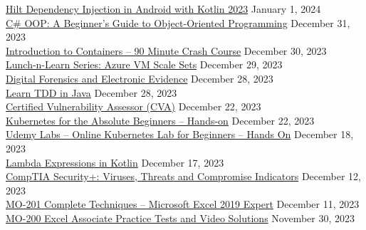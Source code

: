 \documentclass[10pt]{res} %
\begin{document}
\begin{resume}
\href{https://www.udemy.com/certificate/UC-a7321242-6a28-47bd-8f82-03e4c99372de}{\color{blue}Hilt Dependency Injection in Android with Kotlin 2023} \hfill January 1, 2024 \\
\href{https://www.udemy.com/certificate/UC-38f5c02a-aaf1-4d5f-ab4e-e7dd4f1c49cb}{\color{blue}C\# OOP: A Beginner's Guide to Object-Oriented Programming} \hfill December 31, 2023 \\
\href{https://www.udemy.com/certificate/UC-414ae691-4a04-410b-8b20-e8ac95063e46}{\color{blue}Introduction to Containers -- 90 Minute Crash Course} \hfill December 30, 2023 \\
\href{https://www.udemy.com/certificate/UC-3d0fcdfc-b284-4f51-b8d9-627cec5977d4}{\color{blue}Lunch-n-Learn Series: Azure VM Scale Sets} \hfill December 29, 2023 \\
\href{https://www.udemy.com/certificate/UC-6575dc02-3ebb-4eca-a40f-ed5b2932765b}{\color{blue}Digital Forensics and Electronic Evidence} \hfill December 28, 2023 \\
\href{https://www.udemy.com/certificate/UC-d3fab162-e168-4cd5-89b3-b12adcc61fa0}{\color{blue}Learn TDD in Java} \hfill December 28, 2023 \\
\href{https://www.udemy.com/certificate/UC-e34b247a-af92-4086-945a-d4144d8460d6}{\color{blue}Certified Vulnerability Assessor (CVA)} \hfill December 22, 2023 \\
\href{https://www.udemy.com/certificate/UC-9ccaf0ff-ce7d-45bd-9112-bbb4fa0709f4}{\color{blue}Kubernetes for the Absolute Beginners -- Hands-on} \hfill December 22, 2023 \\
\hspace*{1em}\faLaptop\space \href{https://kodekloud.com/certificate-verification/2D16C11DCB74-2DEA6B9505D1-2D16BAEADDF4}{\color{blue}Udemy Labs -- Online Kubernetes Lab for Beginners -- Hands On} \hfill December 18, 2023 \\
\href{https://www.udemy.com/certificate/UC-5a603cda-2254-4f28-a4a1-0a06aca10da6}{\color{blue}Lambda Expressions in Kotlin} \hfill December 17, 2023 \\
\href{https://www.udemy.com/certificate/UC-8327295c-48df-4caf-8d70-8eea2a01bd9b}{\color{blue}CompTIA Security+: Viruses, Threats and Compromise Indicators} \hfill December 12, 2023 \\
\href{https://www.udemy.com/certificate/UC-4dc8eaf7-238f-4fb0-b957-22d8724eaafe}{\color{blue}MO-201 Complete Techniques -- Microsoft Excel 2019 Expert} \hfill December 11, 2023 \\
\href{https://www.udemy.com/certificate/UC-737b7f34-92ca-4a74-93c1-914f0b87919a}{\color{blue}MO-200 Excel Associate Practice Tests and Video Solutions} \hfill November 30, 2023 \\

\end{resume}
\end{document}

